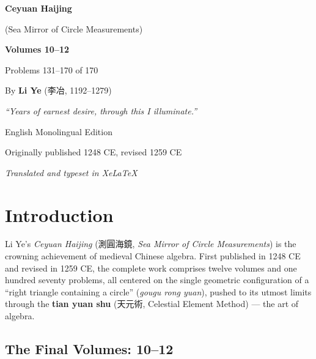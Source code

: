 \documentclass[11pt,a4paper]{book}
\newcommand{\cnote}[1]{\textcolor{notecolor}{\textit{#1}}}
\begin{document}
\frontmatter
\begin{titlepage}
\begin{center}
\vspace*{2cm}

{\fontsize{28}{34}\selectfont\bfseries\color{titlecolor} Ceyuan Haijing}

\vspace{0.4cm}
{\large\color{titlecolor} (Sea Mirror of Circle Measurements)}

\vspace{1cm}
{\Large\bfseries Volumes 10--12}

\vspace{0.4cm}
{\large Problems 131--170 of 170}

\vspace{2cm}
{\large By \textbf{Li Ye} (李冶, 1192--1279)}

\vspace{0.5cm}
{\small\cnote{``Years of earnest desire, through this I illuminate.''}}

\vspace{2cm}
{\small English Monolingual Edition}

\vspace{0.3cm}
{\footnotesize Originally published 1248 CE, revised 1259 CE}

\vspace{1cm}
{\small\cnote{Translated and typeset in XeLaTeX}}

\end{center}
\end{titlepage}

\tableofcontents
\newpage

\mainmatter
\chapter*{Introduction}

Li Ye's \textit{Ceyuan Haijing} (測圓海鏡, \textit{Sea Mirror of Circle Measurements}) is the crowning achievement of medieval Chinese algebra. First published in 1248 CE and revised in 1259 CE, the complete work comprises twelve volumes and one hundred seventy problems, all centered on the single geometric configuration of a ``right triangle containing a circle'' (\textit{gougu rong yuan}), pushed to its utmost limits through the \textbf{tian yuan shu} (天元術, Celestial Element Method) --- the art of algebra.

\section*{The Final Volumes: 10--12}
\end{document}
